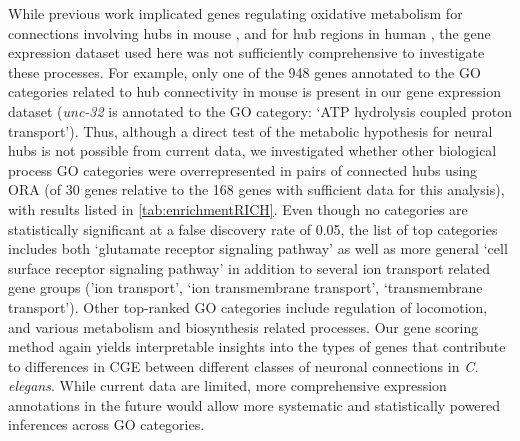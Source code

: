 {While previous work implicated genes regulating oxidative metabolism for connections involving hubs in mouse \citep{Fulcher2016}, and for hub regions in human \citep{Vertes2016b}, the gene expression dataset used here was not sufficiently comprehensive to investigate these processes.
For example, only one of the 948 genes annotated to the GO categories related to hub connectivity in mouse is present in our gene expression dataset (\emph{unc-32} is annotated to the GO category: `ATP hydrolysis coupled proton transport').
Thus, although a direct test of the metabolic hypothesis for neural hubs is not possible from current data, we investigated whether other biological process GO categories were overrepresented in pairs of connected hubs using ORA (of 30 genes relative to the 168 genes with sufficient data for this analysis), with results listed in \ref{tab:enrichmentRICH}.
Even though no categories are statistically significant at a false discovery rate of 0.05, the list of top categories includes both `glutamate receptor signaling pathway' as well as more general `cell surface receptor signaling pathway' in addition to several ion transport related gene groups ('ion transport', `ion transmembrane transport', `transmembrane transport').
Other top-ranked GO categories include regulation of locomotion, and various metabolism and biosynthesis related processes.
Our gene scoring method again yields interpretable insights into the types of genes that contribute to differences in CGE between different classes of neuronal connections in \emph{C. elegans}.
While current data are limited, more comprehensive expression annotations in the future would allow more systematic and statistically powered inferences across GO categories.

}
